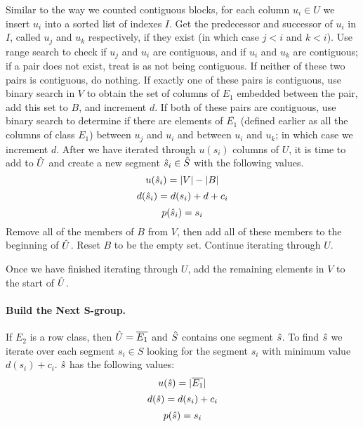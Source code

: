 Similar to the way we counted contiguous blocks, for each column $u_i \in U$ we insert $u_i$ into a sorted list of indexes $I$.
Get the predecessor and successor of $u_i$ in $I$, called $u_j$ and $u_k$
respectively, if they exist (in which case $j < i$ and $k < i$).
Use range search to check if $u_j$ and $u_i$ are contiguous,
and if $u_i$ and $u_k$ are contiguous; if a pair does not exist,
treat is as not being contiguous.
If neither of these two pairs is contiguous, do nothing.
If exactly one of these pairs is contiguous, use binary search in $V$
to obtain the set of columns of $E_1$ embedded between the pair,
add this set to $B$, and increment $d$.
If both of these pairs are contiguous, use binary search to determine
if there are elements of $\overline{E_1}$
(defined earlier as all the columns of class $E_1$)
 between $u_j$ and $u_i$ and between
$u_i$ and $u_k$; in which case we increment $d$.
After we have iterated through $u(s_i)$ columns of $U$, it is time to add to
$\hat{U}$ and create a new segment $\hat{s}_i \in \hat{S}$ with the following values.
$$u(\hat{s}_i) = |V| - |B|$$
$$d(\hat{s}_i) = d(s_i) + d + c_i$$
$$p(\hat{s}_i) = s_i$$ %
Remove all of the members of $B$ from $V$,
 then add all of these members to the beginning of $\hat{U}$.
Reset $B$ to be the empty set.
Continue iterating through $U$.

Once we have finished iterating through $U$, add the remaining elements in $V$ to the start of $\hat{U}$.

\paragraph{Build the Next S-group.}
If $E_2$ is a row class, then $\hat{U} = \overline{E_1}$
 and $\hat{S}$ contains one segment $\hat{s}$.
To find $\hat{s}$ we iterate over each segment $s_i \in S$
looking for the segment $s_i$ with minimum value $d(s_i) + c_i$.
$\hat{s}$ has the following values:
$$u(\hat{s}) = |\overline{E_1}|$$
$$d(\hat{s}) = d(s_i) + c_i$$ %
$$p(\hat{s}) = s_i$$ %

